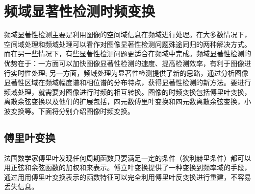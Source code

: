 

\section{频域显著性检测时频变换}
\label{2_2}

频域显著性检测主要是利用图像的空间域信息在频域进行处理。在大多数情况下，空间域处理和频域处理可以看作对图像显著性检测问题殊途同归的两种解决方式。而在另一些情况下，有些显著性检测问题更适合在频域中完成。频域显著性检测的优势在于：一方面可以加快图像显著性检测的速度、提高检测效率，有利于图像进行实时性处理; 另一方面，频域处理为显著性检测提供了新的思路，通过分析图像显著性区域在频域幅度谱和相位谱的分布特点，获得显著性检测的新方法。要进行频域处理，就需要对图像进行时频的相互转换。图像的时频变换包括傅里叶变换，离散余弦变换以及他们的扩展包括，四元数傅里叶变换和四元数离散余弦变换，小波变换等。下面将分别介绍图像时频变换。

\subsection{傅里叶变换}
\label{2_2_1}

法国数学家傅里叶发现任何周期函数只要满足一定的条件（狄利赫里条件）都可以用正弦和余弦函数的加权和来表示\cite{ZhangZheng2010book}。傅立叶变换提供了一种变换到频率域的手段，通过用用傅里叶变换表示的函数特征可以完全利用傅里叶反变换进行重建，不容易丢失信息。

